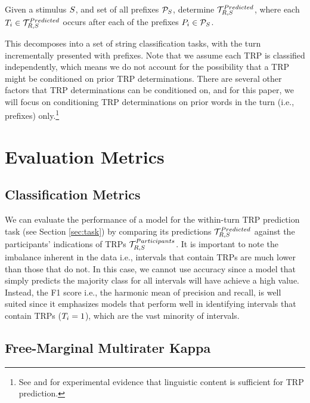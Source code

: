 \begin{definition}
    Given a stimulus $S$, and set of all prefixes $\mathcal{P}_S$, determine $\mathcal{T}_{R, S}^{Predicted}$, where each $T_{i} \in \mathcal{T}_{R, S}^{Predicted}$ occurs after each of the prefixes $P_{i} \in \mathcal{P}_S$.
\end{definition}
This decomposes into a set of string classification tasks, with the turn incrementally presented with prefixes. Note that we assume each TRP is classified independently, which means we do not account for the possibility that a TRP might be conditioned on prior TRP determinations. There are several other factors that TRP determinations can be conditioned on, and for this paper, we will focus on conditioning TRP determinations on prior words in the turn (i.e., prefixes) only.\footnote{See \citet{deRuiter2006ProjectingTheEnd} and \citet{riest2015anticipation} for experimental evidence that linguistic content is sufficient for TRP prediction.}




\section{Evaluation Metrics}
\label{sec:measures}

\subsection*{Classification Metrics}

We can evaluate the performance of a model for the within-turn TRP prediction task (see Section \ref{sec:task}) by comparing its predictions $\mathcal{T}_{R, S}^{Predicted}$ against the participants' indications of TRPs $\mathcal{T}_{R, S}^{Participants}$.  It is important to note the imbalance inherent in  the data i.e., intervals that contain TRPs are much lower than those that do not. In this case, we cannot use accuracy since a model that simply predicts the majority class for all intervals will have achieve a high value. Instead, the F1 score i.e., the harmonic mean of precision and recall, is well suited since it emphasizes models that perform well in identifying intervals that contain TRPs ($T_{i} = 1$), which are the vast minority of intervals.


\subsection*{Free-Marginal Multirater Kappa}


